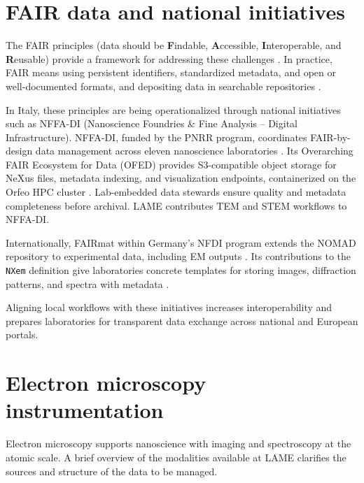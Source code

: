 \section{FAIR data and national initiatives}

The FAIR principles (data should be \textbf{F}indable, \textbf{A}ccessible, \textbf{I}nteroperable, and \textbf{R}eusable) provide a framework for addressing these challenges \parencite{Wilkinson2016FAIR,GOFAIRPrinciples}. 
In practice, FAIR means using persistent identifiers, standardized metadata, and open or well-documented formats, and depositing data in searchable repositories \parencite{EC2018TurningFAIR,EC2021HEGuide}. 

In Italy, these principles are being operationalized through national initiatives such as NFFA-DI (Nanoscience Foundries \& Fine Analysis – Digital Infrastructure). 
NFFA-DI, funded by the PNRR program, coordinates FAIR-by-design data management across eleven nanoscience laboratories \parencite{nffamaster2024}. 
Its Overarching FAIR Ecosystem for Data (OFED) provides S3-compatible object storage for NeXus files, metadata indexing, and visualization endpoints, containerized on the Orfeo HPC cluster \parencite{ofedslides}. 
Lab-embedded data stewards ensure quality and metadata completeness before archival. 
LAME contributes TEM and STEM workflows to NFFA-DI.

Internationally, FAIRmat within Germany’s NFDI program extends the NOMAD repository to experimental data, including EM outputs \parencite{fairmatPortal}. 
Its contributions to the \texttt{NXem} definition give laboratories concrete templates for storing images, diffraction patterns, and spectra with metadata \parencite{fairmathdf5}. 

Aligning local workflows with these initiatives increases interoperability and prepares laboratories for transparent data exchange across national and European portals.

\section{Electron microscopy instrumentation}

Electron microscopy supports nanoscience with imaging and spectroscopy at the atomic scale. 
A brief overview of the modalities available at LAME clarifies the sources and structure of the data to be managed.

